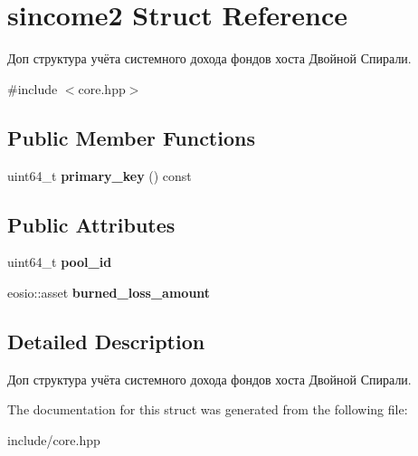 \hypertarget{structsincome2}{}\section{sincome2 Struct Reference}
\label{structsincome2}


Доп структура учёта системного дохода фондов хоста Двойной Спирали.  




{\ttfamily \#include $<$core.\+hpp$>$}

\subsection*{Public Member Functions}
\begin{DoxyCompactItemize}
\item 
\mbox{\label{structsincome2_a4894afa5216d13f6fec791f3e3bf1d88}} 
uint64\+\_\+t {\bfseries primary\+\_\+key} () const
\end{DoxyCompactItemize}
\subsection*{Public Attributes}
\begin{DoxyCompactItemize}
\item 
\mbox{\label{structsincome2_a2fc56b3db567d9dbee93795cfc0621df}} 
uint64\+\_\+t {\bfseries pool\+\_\+id}
\item 
\mbox{\label{structsincome2_a562248e01d10f7967f6f8eeb069f4614}} 
eosio\+::asset {\bfseries burned\+\_\+loss\+\_\+amount}
\end{DoxyCompactItemize}


\subsection{Detailed Description}
Доп структура учёта системного дохода фондов хоста Двойной Спирали. 

The documentation for this struct was generated from the following file\+:\begin{DoxyCompactItemize}
\item 
include/core.\+hpp\end{DoxyCompactItemize}
